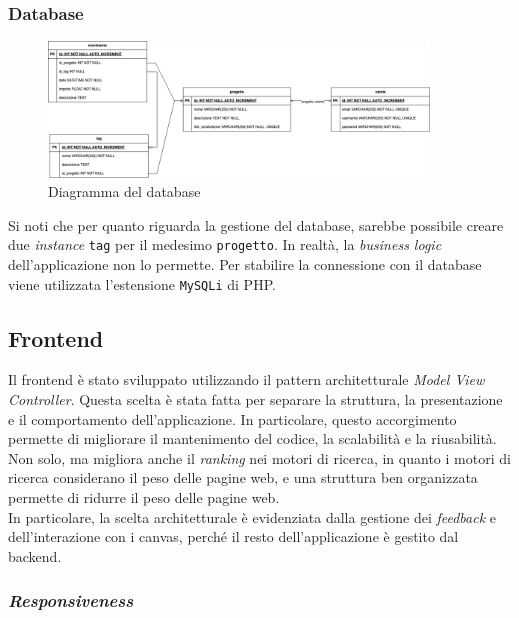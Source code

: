 \subsubsection{Database}

\begin{figure}[H]
	\centering
	\includegraphics[width=0.9\textwidth]{figures/Database.png}
	\caption{Diagramma del database}
\end{figure}

Si noti che per quanto riguarda la gestione del database, sarebbe possibile
creare due \textit{instance} \texttt{tag} per il medesimo \texttt{progetto}. In 
realtà, la \textit{business logic} dell'applicazione non lo permette.
Per stabilire la connessione con il database viene utilizzata l'estensione
\texttt{MySQLi} di PHP.

\subsection{Frontend}

Il frontend è stato sviluppato utilizzando il pattern architetturale
\textit{Model View Controller}. Questa scelta è stata fatta per separare la
struttura, la presentazione e il comportamento dell'applicazione. In
particolare, questo accorgimento permette di migliorare il mantenimento del
codice, la scalabilità e la riusabilità. Non solo, ma migliora anche il
\textit{ranking} nei motori di ricerca, in quanto i motori di ricerca
considerano il peso delle pagine web, e una struttura ben organizzata permette
di ridurre il peso delle pagine web.\\
In particolare, la scelta architetturale è evidenziata dalla gestione dei
\textit{feedback} e dell'interazione con i canvas, perché il resto
dell'applicazione è gestito dal backend.

\subsubsection{\textit{Responsiveness}}

